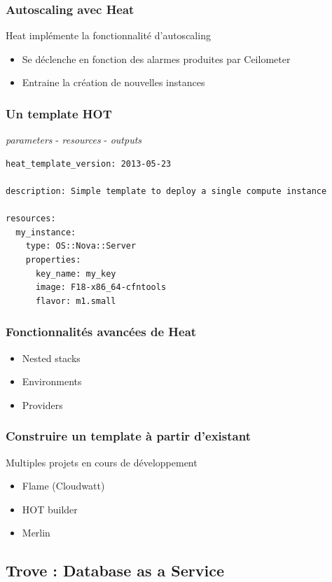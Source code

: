   \begin{frame}
    \frametitle{Autoscaling avec Heat}
    Heat implémente la fonctionnalité d'autoscaling
    \begin{itemize}
      \item Se déclenche en fonction des alarmes produites par Ceilometer
      \item Entraine la création de nouvelles instances
    \end{itemize}
  \end{frame}

  \begin{frame}[containsverbatim]
    \frametitle{Un template HOT}
    \textit{parameters} - \textit{resources} - \textit{outputs}
\begin{verbatim}
heat_template_version: 2013-05-23

description: Simple template to deploy a single compute instance

resources:
  my_instance:
    type: OS::Nova::Server
    properties:
      key_name: my_key
      image: F18-x86_64-cfntools
      flavor: m1.small
\end{verbatim}
  \end{frame}

  \begin{frame}
    \frametitle{Fonctionnalités avancées de Heat}
    \begin{itemize}
      \item Nested stacks
      \item Environments
      \item Providers
    \end{itemize}
  \end{frame}

  \begin{frame}
    \frametitle{Construire un template à partir d'existant}
    Multiples projets en cours de développement
    \begin{itemize}
      \item Flame (Cloudwatt)
      \item HOT builder
      \item Merlin
    \end{itemize}
  \end{frame}

  \subsection[Trove]{Trove : Database as a Service}

